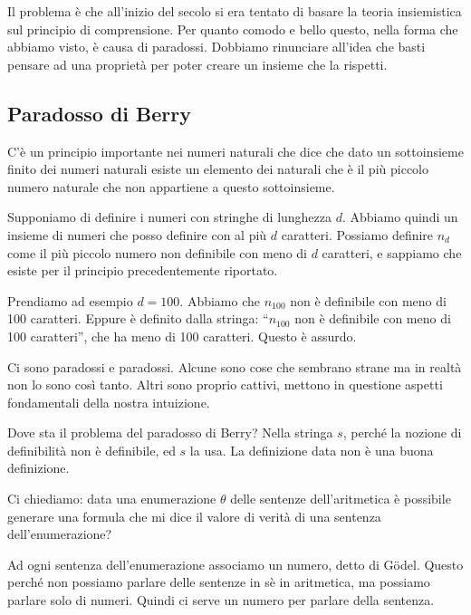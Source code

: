 Il problema è che all'inizio del secolo si era tentato di basare la teoria insiemistica sul
principio di comprensione. Per quanto comodo e bello questo, nella forma che abbiamo visto, è causa
di paradossi. Dobbiamo rinunciare all'idea che basti pensare ad una proprietà per poter creare un
insieme che la rispetti.

\subsection{Paradosso di Berry}

C'è un principio importante nei numeri naturali che dice che dato un sottoinsieme finito dei numeri
naturali esiste un elemento dei naturali che è il più piccolo numero naturale che non appartiene a
questo sottoinsieme.

Supponiamo di definire i numeri con stringhe di lunghezza $d$. Abbiamo quindi un insieme di numeri
che posso definire con al più $d$ caratteri. Possiamo definire $n_d$ come il più piccolo numero
non definibile con meno di $d$ caratteri, e sappiamo che esiste per il principio precedentemente
riportato.

Prendiamo ad esempio $d=100$. Abbiamo che $n_{100}$ non è definibile con meno di 100 caratteri. Eppure
è definito dalla stringa: ``$n_{100}$ non è definibile con meno di 100 caratteri'', che ha meno di 100
caratteri. Questo è assurdo.


Ci sono paradossi e paradossi. Alcune sono cose che sembrano strane ma in realtà non lo sono così
tanto. Altri sono proprio cattivi, mettono in questione aspetti fondamentali della nostra
intuizione.

Dove sta il problema del paradosso di Berry? Nella stringa $s$, perché la nozione di definibilità non
è definibile, ed $s$ la usa. La definizione data non è una buona definizione.

Ci chiediamo: data una enumerazione $\theta$ delle sentenze dell'aritmetica è possibile generare una
formula che mi dice il valore di verità di una sentenza dell'enumerazione?

Ad ogni sentenza dell'enumerazione associamo un numero, detto di Gödel. Questo perché non possiamo
parlare delle sentenze in sè in aritmetica, ma possiamo parlare solo di numeri. Quindi ci serve un
numero per parlare della sentenza.

